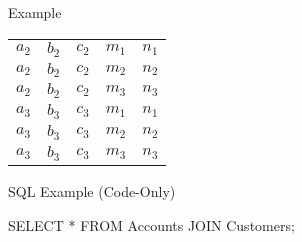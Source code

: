 \begin{multicols}{2}
\begin{CheatsheetEntryFrame}
\begin{RelAlgSubsection}{Example}
\begin{center}
{\begin{tabular}{|ccccc|}
                    $a_2$ & $b_2$ & $c_2$ & $m_1$ & $n_1$ \\
                    $a_2$ & $b_2$ & $c_2$ & $m_2$ & $n_2$ \\
                    $a_2$ & $b_2$ & $c_2$ & $m_3$ & $n_3$ \\
                    $a_3$ & $b_3$ & $c_3$ & $m_1$ & $n_1$ \\
                    $a_3$ & $b_3$ & $c_3$ & $m_2$ & $n_2$ \\
                    $a_3$ & $b_3$ & $c_3$ & $m_3$ & $n_3$ \\ \hline
                \end{tabular}
            }
        \end{center}
        \end{RelAlgSubsection}
        \SubsectionFrameReduceSkip
        \begin{SqlSubsection}{SQL Example (Code-Only)}
            \begin{CheatsheetSubsectionLst}
                SELECT *
                FROM Accounts JOIN Customers;
            \end{CheatsheetSubsectionLst}


        \end{SqlSubsection}

    \end{CheatsheetEntryFrame}

\end{multicols}
\newpage
